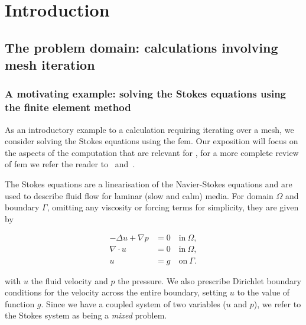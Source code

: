 \documentclass[thesis]{subfiles}
\begin{document}
\chapter{Introduction}
\label{chapter:introduction}



\section{The problem domain: calculations involving mesh iteration}

\subsection{A motivating example: solving the Stokes equations using the finite element method}
\label{sec:stokes_equations}

As an introductory example to a calculation requiring iterating over a mesh, we consider solving the Stokes equations using the \gls{fem}.
Our exposition will focus on the aspects of the computation that are relevant for , for a more complete review of \gls{fem} we refer the reader to~\cite{brennerMathematicalTheoryFinite2008} and~\cite{larsonFiniteElementMethod2013}.

The Stokes equations are a linearisation of the Navier-Stokes equations and are used to describe fluid flow for laminar (slow and calm) media.
For domain $\Omega$ and boundary $\Gamma$, omitting any viscosity or forcing terms for simplicity, they are given by

\begin{subequations}
  \begin{align}
    - \Delta u + \nabla p &= 0 \quad \textrm{in} \ \Omega, \\
    \nabla \cdot u &= 0 \quad \textrm{in} \ \Omega, \\
    u &= g \quad \textrm{on} \ \Gamma.
  \end{align}
  \label{eq:strong_stokes}
\end{subequations}

with $u$ the fluid velocity and $p$ the pressure.
We also prescribe Dirichlet boundary conditions for the velocity across the entire boundary, setting $u$ to the value of function $g$.
Since we have a coupled system of two variables ($u$ and $p$), we refer to the Stokes system as being a \textit{mixed} problem.
\end{document}
